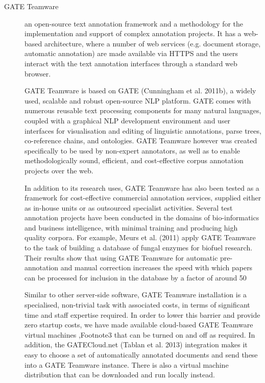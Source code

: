   \begin{description}
    \item[GATE Teamware] 
    an open-source text annotation framework and a methodology for the implementation and support of complex annotation projects. It has a web-based architecture, where a number of web services (e.g. document storage, automatic annotation) are made available via HTTPS and the users interact with the text annotation interfaces through a standard web browser.

    GATE Teamware is based on GATE (Cunningham et al. 2011b), a widely used, scalable and robust open-source NLP platform. GATE comes with numerous reusable text processing components for many natural languages, coupled with a graphical NLP development environment and user interfaces for visualisation and editing of linguistic annotations, parse trees, co-reference chains, and ontologies. GATE Teamware however was created specifically to be used by non-expert annotators, as well as to enable methodologically sound, efficient, and cost-effective corpus annotation projects over the web.

    In addition to its research uses, GATE Teamware has also been tested as a framework for cost-effective commercial annotation services, supplied either as in-house units or as outsourced specialist activities. Several test annotation projects have been conducted in the domains of bio-informatics and business intelligence, with minimal training and producing high quality corpora. For example, Meurs et al. (2011) apply GATE Teamware to the task of building a database of fungal enzymes for biofuel research. Their results show that using GATE Teamware for automatic pre-annotation and manual correction increases the speed with which papers can be processed for inclusion in the database by a factor of around 50 %

    Similar to other server-side software, GATE Teamware installation is a specialised, non-trivial task with associated costs, in terms of significant time and staff expertise required. In order to lower this barrier and provide zero startup costs, we have made available cloud-based GATE Teamware virtual machines ,Footnote3 that can be turned on and off as required. In addition, the GATECloud.net (Tablan et al. 2013) integration makes it easy to choose a set of automatically annotated documents and send these into a GATE Teamware instance. There is also a virtual machine distribution that can be downloaded and run locally instead.
    

\end{description}
